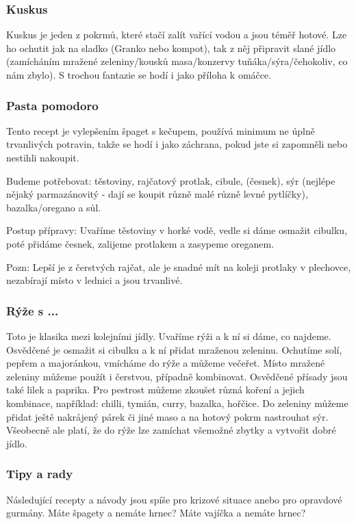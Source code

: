 \subsubsection*{Kuskus}
Kuskus je jeden z pokrmů, které stačí zalít vařící vodou a jsou téměř hotové.
Lze ho ochutit jak na sladko (Granko nebo kompot), tak z něj připravit slané
jídlo (zamícháním mražené zeleniny/kousků masa/konzervy tuňáka/sýra/čehokoliv,
co nám zbylo). S trochou fantazie se hodí i jako příloha k omáčce.


\subsubsection*{Pasta pomodoro}
Tento recept je vylepšením špaget s kečupem, používá minimum ne úplně
trvanlivých potravin, takže se hodí i jako záchrana, pokud jste si zapomněli
nebo nestihli nakoupit.

Budeme potřebovat: těstoviny, rajčatový protlak, cibule, (česnek), sýr (nejlépe
nějaký parmazánovitý - dají se koupit různě malé různě levné pytlíčky),
bazalka/oregano a sůl.

Postup přípravy: Uvaříme těstoviny v horké vodě, vedle si dáme osmažit cibulku,
poté přidáme česnek, zalijeme protlakem a zasypeme oreganem.

Pozn: Lepší je z čerstvých rajčat, ale je snadné mít na koleji protlaky v
plechovce, nezabírají místo v lednici a jsou trvanlivé.


\subsubsection*{Rýže s ...}
Toto je klasika mezi kolejními jídly. Uvaříme rýži a k ní si dáme, co najdeme.
Osvědčené je osmažit si cibulku a k ní přidat mraženou zeleninu. Ochutíme solí,
pepřem a majoránkou, vmícháme do rýže a můžeme večeřet. Místo mražené zeleniny
můžeme použít i čerstvou, případně kombinovat. Osvědčené přísady jsou také lilek
a paprika. Pro pestrost můžeme zkoušet různá koření a jejich kombinace,
například: chilli, tymián, curry, bazalka, hořčice. Do zeleniny můžeme přidat
ještě nakrájený párek či jiné maso a na hotový pokrm nastrouhat sýr. Všeobecně
ale platí, že do rýže lze zamíchat všemožné zbytky a vytvořit dobré jídlo.


\subsubsection*{Tipy a rady}
Následující recepty a návody jsou spíše pro krizové situace anebo pro opravdové
gurmány. Máte špagety a nemáte hrnec? Máte vajíčka a nemáte hrnec?

